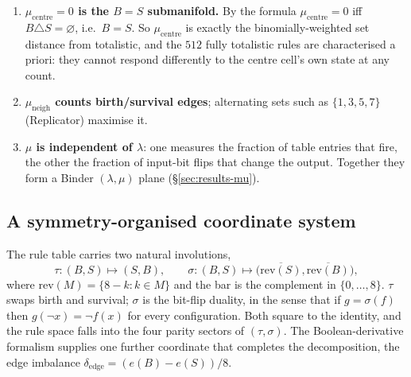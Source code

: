 \documentclass{article}
\begin{document}
\begin{enumerate}
  \item \textbf{$\mu_{\text{centre}}=0$ is the $B=S$ submanifold.} By the formula
    $\mu_{\text{centre}}=0$ iff $B\triangle S=\varnothing$, i.e.\ $B=S$. So
    $\mu_{\text{centre}}$ is exactly the binomially-weighted set distance from
    totalistic, and the $512$ fully totalistic rules are characterised a priori:
    they cannot respond differently to the centre cell's own state at any count.
  \item \textbf{$\mu_{\text{neigh}}$ counts birth/survival edges}; alternating
    sets such as $\{1,3,5,7\}$ (Replicator) maximise it.
  \item \textbf{$\mu$ is independent of $\lambda$}: one measures the fraction of
    table entries that fire, the other the fraction of input-bit flips that
    change the output. Together they form a Binder $(\lambda,\mu)$ plane
    (\S\ref{sec:results-mu}).
\end{enumerate}

\subsection{A symmetry-organised coordinate system}
\label{sec:symm}

The rule table carries two natural involutions,
\begin{equation}
  \tau:(B,S)\mapsto(S,B),\qquad
  \sigma:(B,S)\mapsto\bigl(\overline{\mathrm{rev}(S)},\overline{\mathrm{rev}(B)}\bigr),
\end{equation}
where $\mathrm{rev}(M)=\{8-k:k\in M\}$ and the bar is the complement in
$\{0,\dots,8\}$. $\tau$ swaps birth and survival; $\sigma$ is the bit-flip
duality, in the sense that if $g=\sigma(f)$ then $g(\lnot x)=\lnot f(x)$ for every
configuration. Both square to the identity, and the rule space falls into the
four parity sectors of $(\tau,\sigma)$. The Boolean-derivative formalism supplies
one further coordinate that completes the decomposition, the edge imbalance
$\delta_{\text{edge}}=(e(B)-e(S))/8$.
\end{document}

